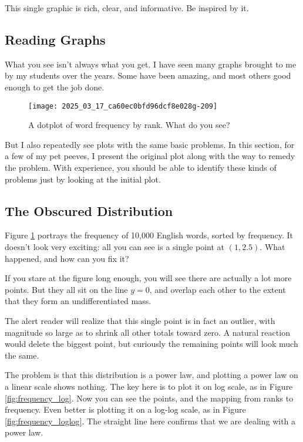 \documentclass[10pt]{article}
\begin{document}
This single graphic is rich, clear, and informative. Be inspired by it.

\subsection{Reading Graphs}
What you see isn't always what you get. I have seen many graphs brought to me by my students over the years. Some have been amazing, and most others good enough to get the job done.

\begin{figure}[htbp]
    \centering
    \texttt{[image: 2025\_03\_17\_ca60ec0bfd96dcf8e028g-209]}
    \caption{A dotplot of word frequency by rank. What do you see?}
    \label{fig:word_frequency}
\end{figure}

But I also repeatedly see plots with the same basic problems. In this section, for a few of my pet peeves, I present the original plot along with the way to remedy the problem. With experience, you should be able to identify these kinds of problems just by looking at the initial plot.

\subsection{The Obscured Distribution}
Figure \ref{fig:word_frequency} portrays the frequency of 10,000 English words, sorted by frequency. It doesn't look very exciting: all you can see is a single point at $(1,2.5)$. What happened, and how can you fix it?

If you stare at the figure long enough, you will see there are actually a lot more points. But they all sit on the line $y=0$, and overlap each other to the extent that they form an undifferentiated mass.

The alert reader will realize that this single point is in fact an outlier, with magnitude so large as to shrink all other totals toward zero. A natural reaction would delete the biggest point, but curiously the remaining points will look much the same.

The problem is that this distribution is a power law, and plotting a power law on a linear scale shows nothing. The key here is to plot it on log scale, as in Figure \ref{fig:frequency_log}. Now you can see the points, and the mapping from ranks to frequency. Even better is plotting it on a log-log scale, as in Figure \ref{fig:frequency_loglog}. The straight line here confirms that we are dealing with a power law.
\end{document}
